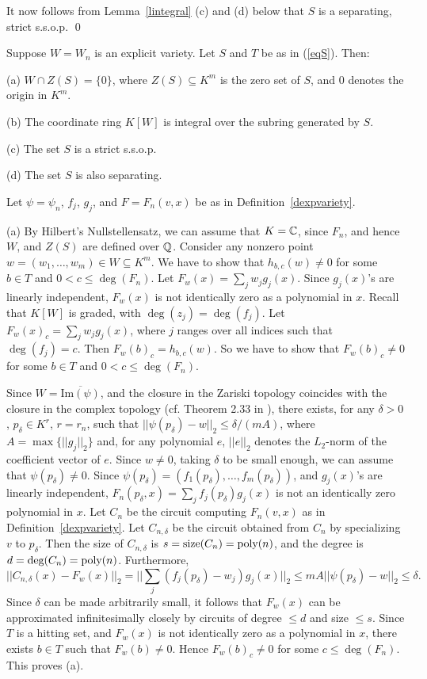 \documentclass[11pt]{article}
\begin{document}
It now follows from  Lemma~\ref{lintegral} (c) and (d) below
that $S$ is  a separating, strict s.s.o.p.  \qed 

\begin{lemma} \label{lintegral} 
Suppose  $W=W_n$ is an  explicit variety.
Let $S$ and $T$ be as in (\ref{eqS}). Then:

\noindent (a) $W \cap Z(S) = \{0\}$, where $Z(S)\subseteq K^m$ is the zero set of $S$, and $0$ denotes the origin in $K^m$. 

\noindent (b) The coordinate ring  $K[W]$ is integral over the  subring generated by $S$.

\noindent (c) The set $S$ is a strict  s.s.o.p.

\noindent (d) The set $S$ is also separating.

\end{lemma} 

\proof Let $\psi=\psi_n$, $f_j$, $g_j$, and  $F=F_n(v,x)$ be as in Definition~\ref{dexpvariety}. 

\noindent (a) By Hilbert's Nullstellensatz, we can assume that $K=\mathbb{C}$, since $F_n$, and hence $W$, and $Z(S)$ are
defined over $\mathbb{Q}$.
Consider any nonzero point $w=(w_1,\ldots,w_m) \in W \subseteq K^m$. We have to show that $h_{b,c}(w)\not = 0$ for some 
$b \in T$ and $0< c \le \deg(F_n)$. Let $F_w(x)=\sum_j w_j g_j(x)$.  Since $g_j(x)$'s are linearly independent, 
$F_w(x)$ is not identically zero as a polynomial in $x$.
Recall that  $K[W]$ is graded, with $\deg(z_j)=\deg(f_j)$. 
Let $F_w(x)_c = \sum_j w_j g_j(x)$, where $j$ ranges over all indices such that $\deg(f_j)=c$. Then $F_w(b)_c= h_{b,c}(w)$. 
So we have to show that $F_w(b)_c \not = 0$ for some $b \in T$ and $0< c \le \deg(F_n)$.

Since $W=\overline{\mbox{Im}(\psi)}$, and the closure in the Zariski topology coincides with the closure in the complex topology
(cf. Theorem 2.33 in \cite{mumfordalg}), there exists, for any $\delta>0$,
 $p_\delta \in K^r$, $r=r_n$, such that $||\psi(p_\delta)-w||_2 \le \delta/(m A)$,
where $A=\max\{||g_j||_2\}$ and, for any polynomial $e$,  $||e||_2$ denotes 
the $L_2$-norm of the coefficient vector of $e$. Since $w\not = 0$, 
taking $\delta$ to be small enough, we can assume
that $\psi(p_\delta)\not = 0$. Since $\psi(p_\delta)=(f_1(p_\delta),\ldots,f_m(p_\delta))$,
 and $g_j(x)$'s are linearly independent, 
$F_n(p_\delta,x)=\sum_j f_j(p_\delta) g_j(x)$ is not an identically zero
polynomial in $x$.  Let $C_n$ be the circuit computing $F_n(v,x)$ as in Definition~\ref{dexpvariety}. 
Let $C_{n,\delta}$ be   the circuit obtained from $C_n$ by specializing $v$ to $p_\delta$.
Then the size of $C_{n,\delta}$ is $s=\mbox{size}(C_n)={\mbox {poly}}(n)$, and the degree is $d=\mbox{deg}(C_n)={\mbox {poly}}(n)$. Furthermore, 
\[ ||C_{n,\delta}(x)-F_w(x)||_2 = || \sum_j (f_j(p_\delta)-w_j) g_j(x)||_2 \le m A ||\psi(p_\delta)-w||_2 \le \delta.\] 
Since $\delta$ can be made arbitrarily small,
it follows that $F_w(x)$ can be approximated infinitesimally closely 
by circuits of  degree $\le d$ and size $\le s$. Since $T$ is a hitting set, and $F_w(x)$ is not identically zero as a polynomial
in $x$, there exists $b\in T$ such that $F_w(b)\not = 0$. Hence $F_w(b)_c \not = 0$ for some $c \le \deg(F_n)$. This proves (a).
\end{document}
